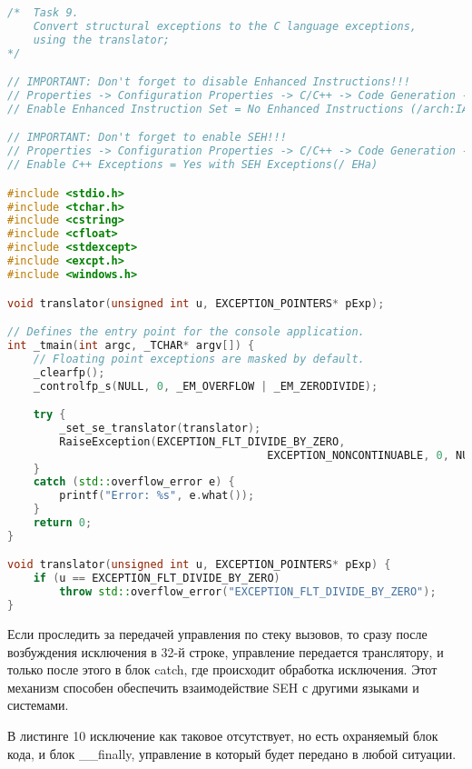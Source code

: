 \documentclass[a4paper,12pt]{article} %
\begin{document}
\begin{lstlisting}[language=C++, caption={Трансформация исключений}]
/*  Task 9.
	Convert structural exceptions to the C language exceptions,
	using the translator;
*/

// IMPORTANT: Don't forget to disable Enhanced Instructions!!!
// Properties -> Configuration Properties -> C/C++ -> Code Generation ->
// Enable Enhanced Instruction Set = No Enhanced Instructions (/arch:IA32)

// IMPORTANT: Don't forget to enable SEH!!!
// Properties -> Configuration Properties -> C/C++ -> Code Generation ->
// Enable C++ Exceptions = Yes with SEH Exceptions(/ EHa)

#include <stdio.h>
#include <tchar.h>
#include <cstring>
#include <cfloat>
#include <stdexcept>
#include <excpt.h>
#include <windows.h>

void translator(unsigned int u, EXCEPTION_POINTERS* pExp);

// Defines the entry point for the console application.
int _tmain(int argc, _TCHAR* argv[]) {
	// Floating point exceptions are masked by default.
	_clearfp();
	_controlfp_s(NULL, 0, _EM_OVERFLOW | _EM_ZERODIVIDE);

	try {
		_set_se_translator(translator);
		RaiseException(EXCEPTION_FLT_DIVIDE_BY_ZERO,
										EXCEPTION_NONCONTINUABLE, 0, NULL);
	}
	catch (std::overflow_error e) {
		printf("Error: %s", e.what());
	}
	return 0;
}

void translator(unsigned int u, EXCEPTION_POINTERS* pExp) {
	if (u == EXCEPTION_FLT_DIVIDE_BY_ZERO)
		throw std::overflow_error("EXCEPTION_FLT_DIVIDE_BY_ZERO");
}
\end{lstlisting}

Если проследить за передачей управления по стеку вызовов, то сразу после возбуждения исключения в 32-й строке, управление передается транслятору, и только после этого в блок catch, где происходит обработка исключения. Этот механизм способен обеспечить взаимодействие SEH с другими языками и системами.
\newpage

В листинге 10 исключение как таковое отсутствует, но есть охраняемый блок кода, и блок \_\_finally, управление в который будет передано в любой ситуации.
\end{document}

